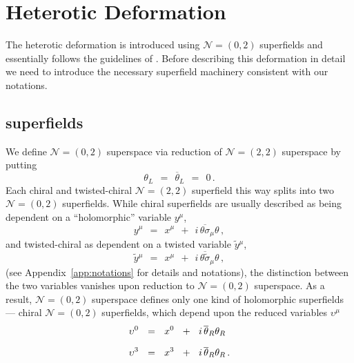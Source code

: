 \documentclass[epsfig,12pt]{article}
\def\beq{\begin{equation}}
\def\eeq{\end{equation}}
\newcommand{\ntwot}{${\mathcal N}= \left(2,2\right) $ }
\newcommand{\ntwoo}{${\mathcal N}= \left(0,2\right) $ }
\newcommand{\wt}{\widetilde}
\newcommand{\ov}{\overline}
\begin{document}
\section{Heterotic Deformation}

	The heterotic deformation is introduced using \ntwoo superfields and
	essentially follows the guidelines of \cite{EdTo}.
	Before describing this deformation in detail we need to introduce the necessary
	superfield machinery consistent with our notations.


\subsection{\boldmath{\ntwoo} superfields}

	We define \ntwoo superspace via reduction of \ntwot superspace by putting
\beq
	\theta_L    ~~=~~    \ov\theta{}_L    ~~=~~    0\,.
\eeq
	Each chiral and twisted-chiral \ntwot superfield this way splits into two \ntwoo superfields.
	While chiral superfields are usually described as being dependent on
	a ``holomorphic'' variable $ y^\mu $,
\beq
	y^\mu    ~~=~~    x^\mu    ~~+~~    i\,\ov{\theta\sigma}{}_\mu\theta\,,
\eeq
	and twisted-chiral as dependent on a twisted variable $ \wt y{}^\mu $,
\beq
	\wt y{}^\mu    ~~=~~    x^\mu    ~~+~~    i\,\ov{\theta\wt\sigma}{}_\mu\theta\,,
\eeq
	(see Appendix~\ref{app:notations} for details and notations), 
	the distinction between the two variables vanishes upon reduction to \ntwoo superspace.
	As a result, \ntwoo superspace defines only one kind of holomorphic superfields --- 
	chiral \ntwoo superfields, which depend upon the reduced variables $ \upsilon^\mu $
\begin{align}
%
\notag
	\upsilon^0 &    ~~=~~    x^0  ~~+~~  i\,\ov\theta{}_R\theta_R
	\\[2mm]
%
	\upsilon^3 &    ~~=~~    x^3  ~~+~~  i\,\ov\theta{}_R\theta_R\,.
\end{align}
\end{document}
